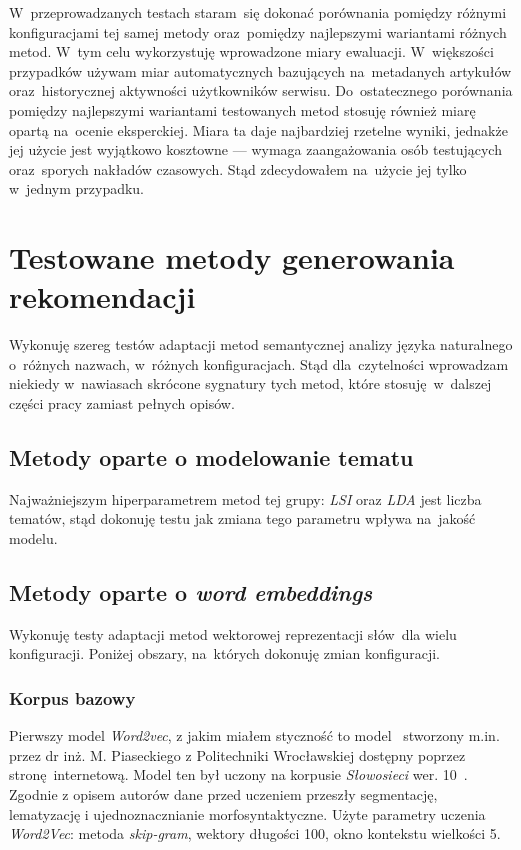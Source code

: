 \documentclass[pl]{minipw} %
\begin{document}
W~przeprowadzanych testach staram~się dokonać porównania pomiędzy różnymi konfiguracjami tej samej metody oraz~pomiędzy najlepszymi wariantami różnych metod. W~tym celu wykorzystuję wprowadzone miary ewaluacji. W~większości przypadków używam miar automatycznych bazujących na~metadanych artykułów oraz~historycznej aktywności użytkowników serwisu. Do~ostatecznego porównania pomiędzy najlepszymi wariantami testowanych metod stosuję również miarę opartą na~ocenie eksperckiej. Miara ta daje najbardziej rzetelne wyniki, jednakże jej użycie jest wyjątkowo kosztowne --- wymaga zaangażowania osób testujących oraz~sporych nakładów czasowych. Stąd zdecydowałem na~użycie jej tylko w~jednym przypadku.

\section{Testowane metody generowania rekomendacji}

Wykonuję szereg testów adaptacji metod semantycznej analizy języka naturalnego o~różnych nazwach, w~różnych konfiguracjach. Stąd dla~czytelności wprowadzam niekiedy w~nawiasach skrócone sygnatury tych metod, które stosuję w~dalszej części pracy zamiast pełnych opisów.

\subsection{Metody oparte o modelowanie tematu}

Najważniejszym hiperparametrem metod tej grupy: \textit{LSI} oraz \textit{LDA} jest liczba tematów, stąd dokonuję testu jak zmiana tego parametru wpływa na~jakość modelu.

\subsection{Metody oparte o \textit{word embeddings}}
Wykonuję testy adaptacji metod wektorowej reprezentacji słów~dla wielu konfiguracji. Poniżej obszary, na~których dokonuję zmian konfiguracji.

\subsubsection{Korpus bazowy}

Pierwszy model \textit{Word2vec}, z jakim miałem styczność to model~\cite{pias} stworzony m.in. przez dr inż. M. Piaseckiego z Politechniki Wrocławskiej dostępny poprzez stronę internetową. Model ten był uczony na korpusie \textit{Słowosieci} wer. 10~\cite{wordnet}. Zgodnie z opisem autorów dane przed uczeniem  przeszły segmentację, lematyzację i ujednoznacznianie morfosyntaktyczne. Użyte parametry uczenia \textit{Word2Vec}: metoda \textit{skip-gram}, wektory długości 100, okno kontekstu wielkości 5.
\end{document}
